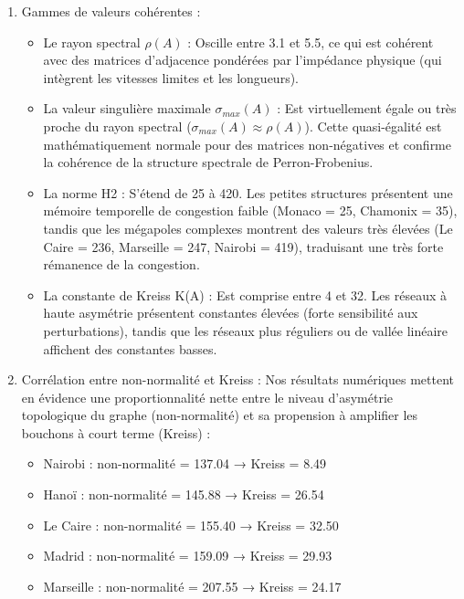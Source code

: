 \documentclass[10pt, a4paper]{article}
\providecommand{\tightlist}{}
\begin{document}
\begin{enumerate}
\def\labelenumi{\arabic{enumi}.}
\item
  Gammes de valeurs cohérentes :

  \begin{itemize}
  \tightlist
  \item
    Le rayon spectral \(\rho(A)\) : Oscille entre 3.1 et 5.5, ce qui est
    cohérent avec des matrices d'adjacence pondérées par l'impédance
    physique (qui intègrent les vitesses limites et les longueurs).
  \item
    La valeur singulière maximale \(\sigma_{max}(A)\) : Est
    virtuellement égale ou très proche du rayon spectral
    (\(\sigma_{max}(A) \approx \rho(A)\)). Cette quasi-égalité est
    mathématiquement normale pour des matrices non-négatives et confirme
    la cohérence de la structure spectrale de Perron-Frobenius.
  \item
    La norme H2 : S'étend de 25 à 420. Les petites structures présentent
    une mémoire temporelle de congestion faible (Monaco = 25, Chamonix =
    35), tandis que les mégapoles complexes montrent des valeurs très
    élevées (Le Caire = 236, Marseille = 247, Nairobi = 419), traduisant
    une très forte rémanence de la congestion.
  \item
    La constante de Kreiss K(A) : Est comprise entre 4 et 32. Les
    réseaux à haute asymétrie présentent constantes élevées (forte
    sensibilité aux perturbations), tandis que les réseaux plus
    réguliers ou de vallée linéaire affichent des constantes basses.
  \end{itemize}
\item
  Corrélation entre non-normalité et Kreiss : Nos résultats numériques
  mettent en évidence une proportionnalité nette entre le niveau
  d'asymétrie topologique du graphe (non-normalité) et sa propension à
  amplifier les bouchons à court terme (Kreiss) :

  \begin{itemize}
  \tightlist
  \item
    Nairobi : non-normalité = 137.04 → Kreiss = 8.49
  \item
    Hanoï : non-normalité = 145.88 → Kreiss = 26.54
  \item
    Le Caire : non-normalité = 155.40 → Kreiss = 32.50
  \item
    Madrid : non-normalité = 159.09 → Kreiss = 29.93
  \item
    Marseille : non-normalité = 207.55 → Kreiss = 24.17
  \end{itemize}


\end{enumerate}
\end{document}

